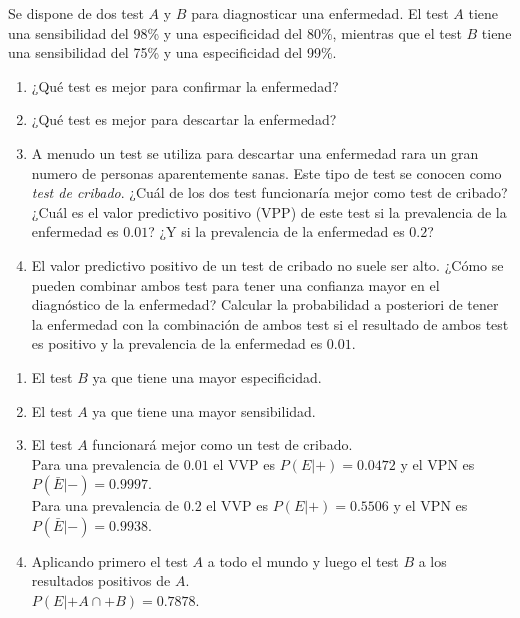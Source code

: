 {Se dispone de dos test $A$ y $B$ para diagnosticar una enfermedad.
El test $A$ tiene una sensibilidad del 98\% y una especificidad del 80\%, mientras que el test $B$ tiene una sensibilidad del 75\% y una especificidad del 99\%.
\begin{enumerate}
\item ¿Qué test es mejor para confirmar la enfermedad?
\item ¿Qué test es mejor para descartar la enfermedad?
\item A menudo un test se utiliza para descartar una enfermedad rara un gran numero de personas aparentemente sanas. 
Este tipo de test se conocen como \emph{test de cribado}.
¿Cuál de los dos test funcionaría mejor como test de cribado?
¿Cuál es el valor predictivo positivo (VPP) de este test si la prevalencia de la enfermedad es $0.01$?
¿Y si la prevalencia de la enfermedad es $0.2$?
\item El valor predictivo positivo de un test de cribado no suele ser alto.
¿Cómo se pueden combinar ambos test para tener una confianza mayor en el diagnóstico de la enfermedad?
Calcular la probabilidad a posteriori de tener la enfermedad con la combinación de ambos test si el resultado de ambos test es positivo y la prevalencia de la enfermedad es $0.01$.
\end{enumerate}
}
{
\begin{enumerate}
\item El test $B$ ya que tiene una mayor especificidad. 
\item El test $A$ ya que tiene una mayor sensibilidad. 
\item El test $A$ funcionará mejor como un test de cribado.\\  
Para una prevalencia de $0.01$ el VVP es $P(E|+)=0.0472$ y el VPN es $P(\bar E|-)=0.9997$.\\
Para una prevalencia de $0.2$ el VVP es $P(E|+)=0.5506$ y el VPN es $P(\bar E|-)=0.9938$.
\item Aplicando primero el test $A$ a todo el mundo y luego el test $B$ a los resultados positivos de $A$.\\
$P(E|+A\cap +B)=0.7878$. 
\end{enumerate}
}
{}

